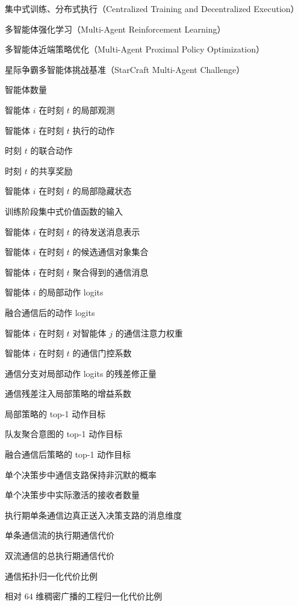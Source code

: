 \begin{denotation}
    \item[CTDE] 集中式训练、分布式执行（Centralized Training and Decentralized Execution）
    \item[MARL] 多智能体强化学习（Multi-Agent Reinforcement Learning）
    \item[MAPPO] 多智能体近端策略优化（Multi-Agent Proximal Policy Optimization）
    \item[SMAC] 星际争霸多智能体挑战基准（StarCraft Multi-Agent Challenge）
    \item[$N$] 智能体数量
    \item[$o_i^t$] 智能体 $i$ 在时刻 $t$ 的局部观测
    \item[$a_i^t$] 智能体 $i$ 在时刻 $t$ 执行的动作
    \item[$\mathbf{a}^t$] 时刻 $t$ 的联合动作
    \item[$r_t$] 时刻 $t$ 的共享奖励
    \item[$h_i^t$] 智能体 $i$ 在时刻 $t$ 的局部隐藏状态
    \item[$x^t$] 训练阶段集中式价值函数的输入
    \item[$z_i^t$] 智能体 $i$ 在时刻 $t$ 的待发送消息表示
    \item[$\mathcal{N}_i^t$] 智能体 $i$ 在时刻 $t$ 的候选通信对象集合
    \item[$m_i^t$] 智能体 $i$ 在时刻 $t$ 聚合得到的通信消息
    \item[$\ell_i^{\text{local}}$] 智能体 $i$ 的局部动作 logits
    \item[$\tilde{\ell}_i$] 融合通信后的动作 logits
    \item[$\alpha_{ij}^t$] 智能体 $i$ 在时刻 $t$ 对智能体 $j$ 的通信注意力权重
    \item[$g_i^t$] 智能体 $i$ 在时刻 $t$ 的通信门控系数
    \item[$\Delta_i^t$] 通信分支对局部动作 logits 的残差修正量
    \item[$\lambda$] 通信残差注入局部策略的增益系数
    \item[$a_{i,\text{local}}^{\star}$] 局部策略的 top-1 动作目标
    \item[$a_{i,\text{peer}}^{\star}$] 队友聚合意图的 top-1 动作目标
    \item[$a_{i,\text{fused}}^{\star}$] 融合通信后策略的 top-1 动作目标
    \item[$p_{\mathrm{comm}}$] 单个决策步中通信支路保持非沉默的概率
    \item[$k$] 单个决策步中实际激活的接收者数量
    \item[$d_{\mathrm{exec}}$] 执行期单条通信边真正送入决策支路的消息维度
    \item[$C_{\mathrm{exec}}$] 单条通信流的执行期通信代价
    \item[$C_{\mathrm{total}}$] 双流通信的总执行期通信代价
    \item[$\rho_{\mathrm{topo}}$] 通信拓扑归一化代价比例
    \item[$\rho_{64}$] 相对 $64$ 维稠密广播的工程归一化代价比例
\end{denotation}
